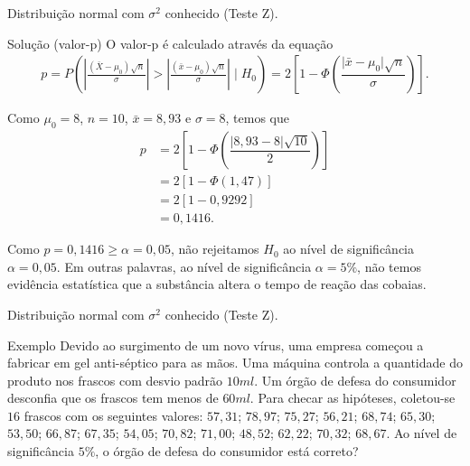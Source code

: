 \documentclass[8pt]{beamer}
\begin{document}
\begin{frame}{Distribuição normal com $\sigma^2$ conhecido (Teste Z).}

\begin{block}{Solução (valor-p)}
	O valor-p é calculado através da equação
	\begin{align*}
	p= P\left(\left\lvert \frac{(\bar{X} - \mu_0)\sqrt{n}}{\sigma} \right\rvert > \left\lvert \frac{(\bar{x} - \mu_0)\sqrt{n}}{\sigma} \right\rvert \mid H_0\right) =2\left[ 1-\Phi\left( \dfrac{\lvert \bar{x} - \mu_0 \rvert \sqrt{n}}{\sigma} \right)\right].
	\end{align*}
	\vfill
	
	Como $\mu_0 = 8$, $n=10$, $\bar{x}=8,93$ e $\sigma=8$, temos que 
	\begin{align*}
	p &= 2\left[ 1- \Phi\left(  \dfrac{\lvert 8,93 - 8 \rvert \sqrt{10}}{2} \right) \right]\\
	&= 2 \left[ 1- \Phi(1,47) \right]\\
	&= 2 [ 1- 0,9292] \\
	&= 0,1416.
	\end{align*}
	
	Como $p=0,1416 \geq \alpha= 0,05$, não rejeitamos $H_0$ ao nível de significância $\alpha = 0,05$. Em outras palavras, ao nível de significância $\alpha = 5\%$, não temos evidência estatística que a substância altera o tempo de reação das cobaias.
		
\end{block}

\end{frame}

\begin{frame}{Distribuição normal com $\sigma^2$ conhecido (Teste Z).}

\large

\begin{block}{Exemplo}
	Devido ao surgimento de um novo vírus, uma empresa começou a fabricar em gel anti-séptico para as mãos. Uma máquina  controla a quantidade do produto nos frascos com desvio padrão $10ml$.
	Um órgão de defesa do consumidor desconfia que os frascos tem menos de $60ml$.
	Para checar as hipóteses, coletou-se $16$ frascos com os seguintes valores: $57,31$; $78,97$; $75,27$; $56,21$; $68,74$; $65,30$; $53,50$; $66,87$; $67,35$; $54,05$; $70,82$; $71,00$;
	$48,52$; $62,22$; $70,32$; $68,67$. Ao nível de significância $5\%$, o órgão de defesa do consumidor está correto?
\end{block}
\normalsize

\end{frame}
\end{document}
